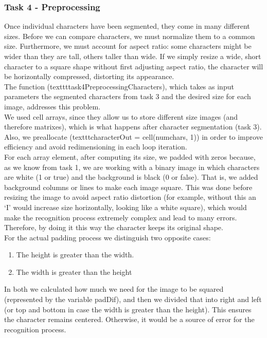 \subsubsection{Task 4 - Preprocessing}
Once individual characters have been segmented, they come in many different sizes. Before we can compare characters, we must normalize them to a common size. Furthermore, we must account for aspect ratio: some characters might be wider than they are tall, others taller than wide. If we simply resize a wide, short character to a square shape without first adjusting aspect ratio, the character will be horizontally compressed, distorting its appearance.\\

The function (texttt{task4PreprocessingCharacters}), which takes as input parameters the segmented characters from task 3 and the desired size for each image, addresses this problem.\\

We used cell arrays, since they allow us to store different size images (and therefore matrixes), which is what happens after character segmentation (task 3). Also, we preallocate (texttt{characterOut = cell(numchars, 1)}) in order to improve efficiency and avoid redimensioning in each loop iteration.\\

For each array element, after computing its size, we padded with zeros because, as we know from task 1, we are working with a binary image in which characters are white (1 or true) and the background is black (0 or false). That is, we added background columns or lines to make each image square. This was done before resizing the image to avoid aspect ratio distortion (for example, without this an ‘I’ would increase size horizontally, looking like a white square), which would make the recognition process extremely complex and lead to many errors. Therefore, by doing it this way the character keeps its original shape.\\

For the actual padding process we distinguish two opposite cases:
\begin{enumerate}[label=\alph*), leftmargin=1cm]
    \item The height is greater than the width.
    \item The width is greater than the height
\end{enumerate}

In both we calculated how much we need for the image to be squared (represented by the variable padDif), and then we divided that into right and left (or top and bottom in case the width is greater than the height). This ensures the character remains centered. Otherwise, it would be a source of error for the recognition process.\\

